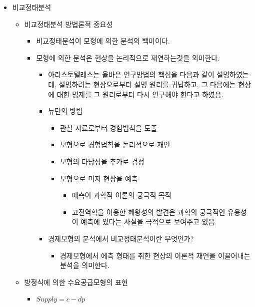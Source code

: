 \documentclass{report}
\begin{document}
\begin{itemize}
    \item 비교정태분석
    \begin{itemize}
        \item 비교정태분석 방법론적 중요성
        \begin{itemize}
            \item 비교정태분석이 모형에 의한 분석의 백미이다.
            \item 모형에 의한 분석은 현상을 논리적으로 재연하는것을 의미한다.
            \begin{itemize}
                \item 아리스토텔레스는 올바은 연구방법의 핵심을 다음과 같이 설명하였는데, 설명하려는 현상으로부터 설명 원리를 귀납하고, 그 다음에는 현상에 대한 명제를 그 원리로부터 다시 연구해야 한다고 하였음.
                \item 뉴턴의 방법
                \begin{itemize}
                    \item 관찰 자료로부터 경험법칙을 도출
                    \item 모형으로 경험법칙을 논리적으로 재연
                    \item 모형의 타당성을 추가로 검정
                    \item 모형으로 미지 현상을 예측
                    \begin{itemize}
                        \item 예측이 과학적 이론의 궁극적 목적
                        \item 고전역학을 이용한 혜왕성의 발견은 과학의 궁극적인 유용성이 예측에 있다는 사실을 극적으로 보여주고 있음.
                    \end{itemize}
                \end{itemize}
            \item 경제모형의 분석에서 비교정태분석이란 무엇인가?
            \begin{itemize}
                \item 경제모형에서 에측 형태를 취한 현상의 이론적 재연을 이끌어내는 분석을 의미한다.
            \end{itemize}
        \end{itemize}
    \end{itemize}
    \item 방정식에 의한 수요공급모형의 표현
    \begin{itemize}
        \item $Supply=c-dp$

\end{itemize}
\end{itemize}
\end{itemize}
\end{document}
